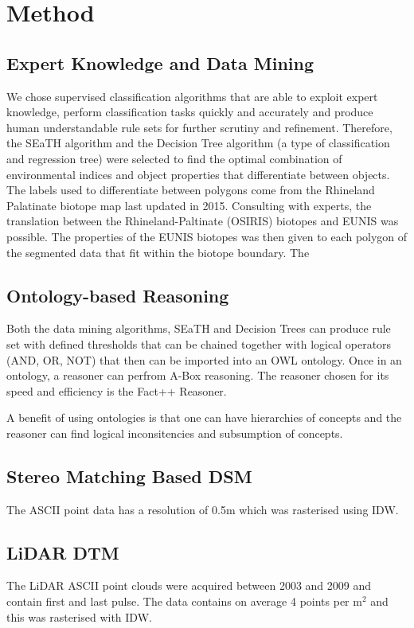 \documentclass[authoryear, review,12pt,number]{elsarticle}
\begin{document}
\section{Method}
\subsection{Expert Knowledge and Data Mining}
We chose supervised classification algorithms that are able to exploit expert
knowledge, perform classification tasks quickly and accurately and produce human
understandable rule sets for further scrutiny and refinement. Therefore, the
SEaTH algorithm and the Decision Tree algorithm (a type of classification and regression
tree) were selected to find the optimal combination of environmental indices and
object properties that differentiate between objects. The labels used to
differentiate between polygons come from the Rhineland Palatinate biotope map
last updated in 2015. Consulting with experts, the translation between the
Rhineland-Paltinate (OSIRIS) biotopes and EUNIS was possible. The properties of
the EUNIS biotopes was then given to each polygon of the segmented data that fit
within the biotope boundary. The 
\subsection{Ontology-based Reasoning}
Both the data mining algorithms, SEaTH and Decision Trees can produce rule
set with defined thresholds that can be chained together with logical operators
(AND, OR, NOT) that then can be imported into an OWL ontology. Once in an
ontology, a reasoner can perfrom A-Box reasoning. The reasoner chosen for its
speed and efficiency is the Fact++ Reasoner.

A benefit of using ontologies is that one can have hierarchies of concepts and
the reasoner can find logical inconsitencies and subsumption of concepts.
\subsection{Stereo Matching Based DSM}
The ASCII point data has a resolution of 0.5m which was rasterised using IDW.
\subsection{LiDAR DTM}
The LiDAR ASCII point clouds were acquired between 2003 and 2009 and contain
first and last pulse. The data contains on average 4 points per m$^{2}$ and
this was rasterised with IDW.
%
\end{document}
